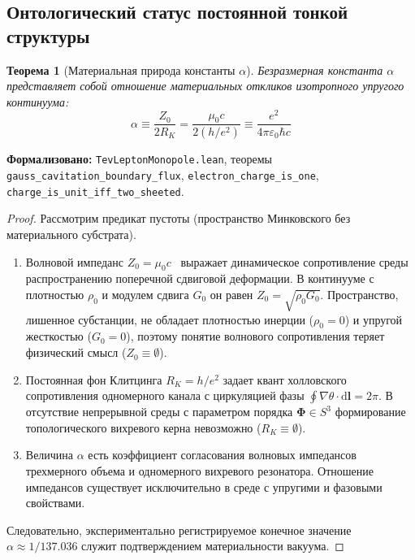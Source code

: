 \documentclass[11pt,a4paper]{article}
\newtheorem{theorem}{Теорема}
\theoremstyle{definition}
\theoremstyle{remark}
\begin{document}
\subsection{Онтологический статус постоянной тонкой структуры}
	
\begin{theorem}[Материальная природа константы $\alpha$]
\label{thm:alpha_materiality_proof}
Безразмерная константа $\alpha$ представляет собой отношение материальных откликов изотропного упругого континуума:
\begin{equation}
\alpha \equiv \frac{Z_0}{2 R_K} = \frac{\mu_0 c}{2 (h/e^2)} \equiv \frac{e^2}{4\pi\varepsilon_0 \hbar c}
\end{equation}
\end{theorem}

\noindent\small\textbf{Формализовано:} \texttt{TevLeptonMonopole.lean}, теоремы \texttt{gauss_cavitation_boundary_flux}, \texttt{electron_charge_is_one}, \texttt{charge_is_unit_iff_two_sheeted}.

\begin{proof}
Рассмотрим предикат пустоты (пространство Минковского без материального субстрата).
\begin{enumerate}
\item Волновой импеданс $Z_0 = \mu_0 c$~\cite{Gordon1923} выражает динамическое сопротивление среды распространению поперечной сдвиговой деформации. В континууме с плотностью $\rho_0$ и модулем сдвига $G_0$ он равен $Z_0 = \sqrt{\rho_0 G_0}$. Пространство, лишенное субстанции, не обладает плотностью инерции ($\rho_0 = 0$) и упругой жесткостью ($G_0 = 0$), поэтому понятие волнового сопротивления теряет физический смысл ($Z_0 \equiv \emptyset$).
\item Постоянная фон Клитцинга $R_K = h/e^2$ задает квант холловского сопротивления одномерного канала с циркуляцией фазы $\oint \nabla\theta \cdot \mathrm{d}\mathbf{l} = 2\pi$. В отсутствие непрерывной среды с параметром порядка $\boldsymbol{\Phi} \in S^3$ формирование топологического вихревого керна невозможно ($R_K \equiv \emptyset$).
\item Величина $\alpha$ есть коэффициент согласования волновых импедансов трехмерного объема и одномерного вихревого резонатора. Отношение импедансов существует исключительно в среде с упругими и фазовыми свойствами.
\end{enumerate}
Следовательно, экспериментально регистрируемое конечное значение $\alpha \approx 1/137.036$ служит подтверждением материальности вакуума.
\end{proof}
\end{document}
